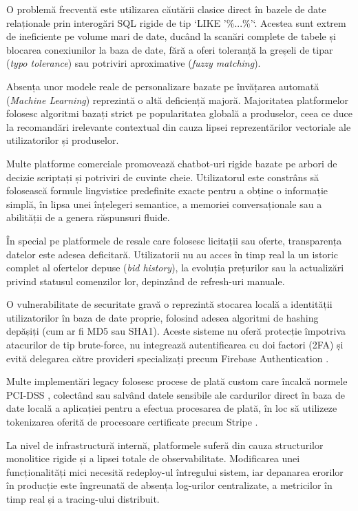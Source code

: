 O problemă frecventă este utilizarea căutării clasice direct în bazele de date relaționale prin interogări SQL rigide de tip `LIKE '\%...\%'`. Acestea sunt extrem de ineficiente pe volume mari de date, ducând la scanări complete de tabele și blocarea conexiunilor la baza de date, fără a oferi toleranță la greșeli de tipar (\textit{typo tolerance}) sau potriviri aproximative (\textit{fuzzy matching}).

Absența unor modele reale de personalizare bazate pe învățarea automată (\textit{Machine Learning}) reprezintă o altă deficiență majoră. Majoritatea platformelor folosesc algoritmi bazați strict pe popularitatea globală a produselor, ceea ce duce la recomandări irelevante contextual din cauza lipsei reprezentărilor vectoriale ale utilizatorilor și produselor.

Multe platforme comerciale promovează chatbot-uri rigide bazate pe arbori de decizie scriptați și potriviri de cuvinte cheie. Utilizatorul este constrâns să folosească formule lingvistice predefinite exacte pentru a obține o informație simplă, în lipsa unei înțelegeri semantice, a memoriei conversaționale sau a abilității de a genera răspunsuri fluide.

În special pe platformele de resale care folosesc licitații sau oferte, transparența datelor este adesea deficitară. Utilizatorii nu au acces în timp real la un istoric complet al ofertelor depuse (\textit{bid history}), la evoluția prețurilor sau la actualizări privind statusul comenzilor lor, depinzând de refresh-uri manuale.

O vulnerabilitate de securitate gravă o reprezintă stocarea locală a identității utilizatorilor în baza de date proprie, folosind adesea algoritmi de hashing depășiți (cum ar fi MD5 sau SHA1). Aceste sisteme nu oferă protecție împotriva atacurilor de tip brute-force, nu integrează autentificarea cu doi factori (2FA) și evită delegarea către provideri specializați precum Firebase Authentication \cite{firebase2026auth}.

Multe implementări legacy folosesc procese de plată custom care încalcă normele PCI-DSS \cite{pci2026dss}, colectând sau salvând datele sensibile ale cardurilor direct în baza de date locală a aplicației pentru a efectua procesarea de plată, în loc să utilizeze tokenizarea oferită de procesoare certificate precum Stripe \cite{stripe2026api}.

La nivel de infrastructură internă, platformele suferă din cauza structurilor monolitice rigide și a lipsei totale de observabilitate. Modificarea unei funcționalități mici necesită redeploy-ul întregului sistem, iar depanarea erorilor în producție este îngreunată de absența log-urilor centralizate, a metricilor în timp real și a tracing-ului distribuit.

